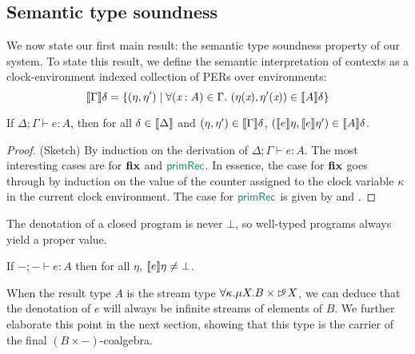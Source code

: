 \subsection{Semantic type soundness}
\label{sec:semantic-soundness}

We now state our first main result: the semantic type soundness
property of our system. To state this result, we define the semantic
interpretation of contexts as a clock-environment indexed collection
of PERs over environments:
\begin{displaymath}
  \sem{\Gamma}\delta = \{(\eta, \eta') \mathrel| \forall (\ident{x} : A) \in \Gamma.\ (\eta(\ident{x}), \eta'(\ident{x})) \in \sem{A}\delta \}
\end{displaymath}

\begin{theorem}\label{thm:semantic-soundness}
  If $\Delta; \Gamma \vdash e : A$, then for all $\delta \in
  \llbracket \Delta \rrbracket$ and $(\eta,\eta') \in \llbracket \Gamma \rrbracket\delta$,
  $(\llbracket e \rrbracket\eta,\llbracket e \rrbracket\eta') \in \llbracket A \rrbracket\delta$.
\end{theorem}

\begin{proof}
  (Sketch) By induction on the derivation of $\Delta; \Gamma \vdash e
  : A$. The most interesting cases are for $\textbf{fix}$ and
  $\elim{primRec}$. In essence, the case for $\textbf{fix}$ goes through
  by induction on the value of the counter assigned to the clock
  variable $\kappa$ in the current clock environment. The case for
  $\elim{primRec}$ is given by  and
  .
\end{proof}

The denotation of a closed program is never $\bot$, so well-typed
programs always yield a proper value.
\begin{corollary}
  If $-; - \vdash e : A$ then for all $\eta$, $\llbracket e \rrbracket\eta \not=
  \bot$.
\end{corollary}
When the result type $A$ is the stream type $\forall \kappa. \mu X. B
\times \mathord{\rhd\kern-0.4em^{\kappa}} X$, we can deduce that the denotation of $e$ will
always be infinite streams of elements of $B$. We further elaborate
this point in the next section, showing that this type is the carrier
of the final $(B \times -)$-coalgebra.

